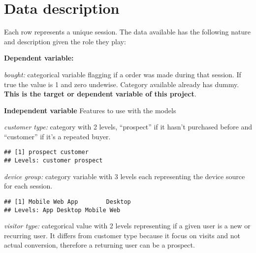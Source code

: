 \documentclass[
]{book}
\newenvironment{Shaded}{\begin{snugshade}}{\end{snugshade}}
\newcommand{\FunctionTok}[1]{\textcolor[rgb]{0.00,0.00,0.00}{#1}}
\newcommand{\NormalTok}[1]{#1}
\newcommand{\SpecialCharTok}[1]{\textcolor[rgb]{0.00,0.00,0.00}{#1}}
\begin{document}
\hypertarget{data-description}{%
\section{Data description}\label{data-description}}

Each row represents a unique session.
The data available has the following nature and description given the role they play:

\textbf{Dependent variable:}

\emph{bought:} categorical variable flagging if a order was made during that session. If true the value is 1 and zero undewise. Category available already has dummy. \textbf{This is the target or dependent variable of this project}.

\textbf{Independent variable}
Features to use with the models

\emph{customer type:} category with 2 levels, ``prospect'' if it hasn't purchased before and ``customer'' if it's a repeated buyer.

\begin{Shaded}
\end{Shaded}

\begin{verbatim}
## [1] prospect customer
## Levels: customer prospect
\end{verbatim}

\emph{device group:} category variable with 3 levels each representing the device source for each session.

\begin{Shaded}
\end{Shaded}

\begin{verbatim}
## [1] Mobile Web App        Desktop   
## Levels: App Desktop Mobile Web
\end{verbatim}

\emph{visitor type:} categorical value with 2 levels representing if a given user is a new or recurring user. It differs from customer type because it focus on visits and not actual conversion, therefore a returning user can be a prospect.
\end{document}
